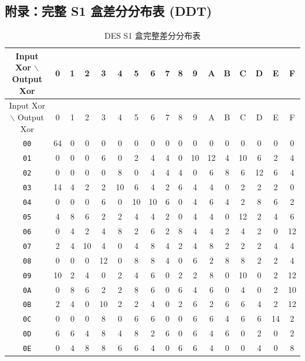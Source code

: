 \documentclass[12pt,a4paper]{article}
\begin{document}
\subsection{附录：完整 S1 盒差分分布表 (DDT)}
\begin{center}
\begin{small}
\begin{longtable}{c|cccccccccccccccc}
\caption{DES S1 盒完整差分分布表} \\
\toprule
Input Xor $\backslash$ Output Xor & 0 & 1 & 2 & 3 & 4 & 5 & 6 & 7 & 8 & 9 & A & B & C & D & E & F \\ \midrule
\endfirsthead
\toprule
Input Xor $\backslash$ Output Xor  & 0 & 1 & 2 & 3 & 4 & 5 & 6 & 7 & 8 & 9 & A & B & C & D & E & F \\ \midrule
\endhead
\texttt{00} & 64 & 0 & 0 & 0 & 0 & 0 & 0 & 0 & 0 & 0 & 0 & 0 & 0 & 0 & 0 & 0 \\
\texttt{01} & 0 & 0 & 0 & 6 & 0 & 2 & 4 & 4 & 0 & 10 & 12 & 4 & 10 & 6 & 2 & 4 \\
\texttt{02} & 0 & 0 & 0 & 0 & 8 & 0 & 4 & 4 & 4 & 0 & 6 & 8 & 6 & 12 & 6 & 4 \\
\texttt{03} & 14 & 4 & 2 & 2 & 10 & 6 & 4 & 2 & 6 & 4 & 4 & 0 & 2 & 2 & 2 & 0 \\
\texttt{04} & 0 & 0 & 0 & 6 & 0 & 10 & 10 & 6 & 0 & 4 & 6 & 4 & 2 & 8 & 6 & 2 \\
\texttt{05} & 4 & 8 & 6 & 2 & 2 & 4 & 4 & 2 & 0 & 4 & 4 & 0 & 12 & 2 & 4 & 6 \\
\texttt{06} & 0 & 4 & 2 & 4 & 8 & 2 & 6 & 2 & 8 & 4 & 4 & 2 & 4 & 2 & 0 & 12 \\
\texttt{07} & 2 & 4 & 10 & 4 & 0 & 4 & 8 & 4 & 2 & 4 & 8 & 2 & 2 & 2 & 4 & 4 \\
\texttt{08} & 0 & 0 & 0 & 12 & 0 & 8 & 8 & 4 & 0 & 6 & 2 & 8 & 8 & 2 & 2 & 4 \\
\texttt{09} & 10 & 2 & 4 & 0 & 2 & 4 & 6 & 0 & 2 & 2 & 8 & 0 & 10 & 0 & 2 & 12 \\
\texttt{0A} & 0 & 8 & 6 & 2 & 2 & 8 & 6 & 0 & 6 & 4 & 6 & 0 & 4 & 0 & 2 & 10 \\
\texttt{0B} & 2 & 4 & 0 & 10 & 2 & 2 & 4 & 0 & 2 & 6 & 2 & 6 & 6 & 4 & 2 & 12 \\
\texttt{0C} & 0 & 0 & 0 & 8 & 0 & 6 & 6 & 0 & 0 & 6 & 6 & 4 & 6 & 6 & 14 & 2 \\
\texttt{0D} & 6 & 6 & 4 & 8 & 4 & 8 & 2 & 6 & 0 & 6 & 4 & 6 & 0 & 2 & 0 & 2 \\
\texttt{0E} & 0 & 4 & 8 & 8 & 6 & 6 & 4 & 0 & 6 & 6 & 4 & 0 & 0 & 4 & 0 & 8 \\

\end{longtable}
\end{small}
\end{center}
\end{document}
